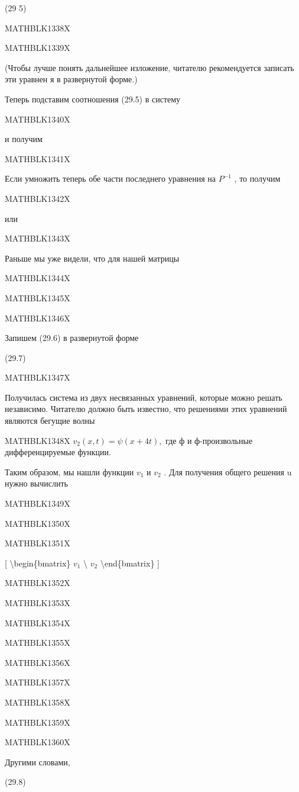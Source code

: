 \documentclass[
]{article}
\begin{document}
{{{(29 5)

MATHBLK1338X

MATHBLK1339X

(Чтобы лучше понять дальнейшее изложение, читателю рекомендуется
записать эти уравнен я в развернутой форме.)

Теперь подставим соотношения (29.5) в систему

MATHBLK1340X

и получим

MATHBLK1341X

Если умножить теперь обе части последнего уравнения на \(P^{-1}\) , то
получим

MATHBLK1342X

или

MATHBLK1343X

Раньше мы уже видели, что для нашей матрицы

MATHBLK1344X

MATHBLK1345X

MATHBLK1346X

Запишем (29.6) в развернутой форме

(29.7)

MATHBLK1347X

Получилась система из двух несвязанных уравнений, которые можно решать
независимо. Читателю должно быть известно, что решениями этих уравнений
являются бегущие волны

MATHBLK1348X \(v_2(x, t) = \psi(x+4t),\) где ф и ф-произвольные
дифференцируемые функции.

Таким образом, мы нашли функции \(v_1\) и \(v_2\) . Для получения общего
решения u нужно вычислить

MATHBLK1349X

MATHBLK1350X

MATHBLK1351X

{[} \textbackslash begin\{bmatrix\} \(v_1\) \textbackslash{} \(v_2\)
\textbackslash end\{bmatrix\} {]}

MATHBLK1352X

MATHBLK1353X

MATHBLK1354X

MATHBLK1355X

MATHBLK1356X

MATHBLK1357X

MATHBLK1358X

MATHBLK1359X

MATHBLK1360X

Другими словами,

(29.8)

}}}
\end{document}
